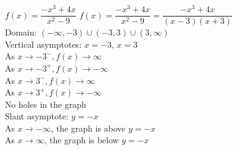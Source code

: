 {$f(x) = \dfrac{-x^{3} + 4x}{x^{2} - 9}$}
{$f(x) = \dfrac{-x^{3} + 4x}{x^{2} - 9} = \dfrac{-x^{3} + 4x}{(x-3)(x+3)} $\\
Domain: $(-\infty, -3) \cup (-3, 3) \cup (3, \infty)$\\
Vertical asymptotes: $x = -3$, $x=3$\\
As $x \rightarrow -3^{-}, f(x) \rightarrow \infty$\\
As $x \rightarrow -3^{+}, f(x) \rightarrow -\infty$\\
As $x \rightarrow 3^{-}, f(x) \rightarrow \infty$\\
As $x \rightarrow 3^{+}, f(x) \rightarrow -\infty$\\
No holes in the graph \\
Slant asymptote: $y=-x$ \\
As $x \rightarrow -\infty$, the graph is above $y=-x$\\
As $x \rightarrow \infty$, the graph is below $y=-x$}